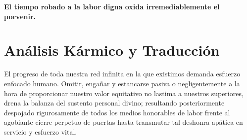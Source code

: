 \vspace{1em}
\begin{center}
    \textbf{\Large El tiempo robado a la labor digna oxida irremediablemente el porvenir.}
\end{center}
\vspace{1em}

\section{Análisis Kármico y Traducción}
\begin{figure}
  \vspace{-1.5em}
  \begin{center}
  \end{center}
  \vspace{-1.5em}
\end{figure}
El progreso de toda nuestra red infinita en la que existimos demanda esfuerzo enfocado humano. Omitir, engañar y estancarse pasiva o negligentemente a la hora de proporcionar nuestro valor equitativo no lastima a nuestros superiores, drena la balanza del sustento personal divino; resultando posteriormente despojado rigurosamente de todos los medios honorables de labor frente al agobiante cierre perpetuo de puertas hasta transmutar tal deshonra apática en servicio y esfuerzo vital.

